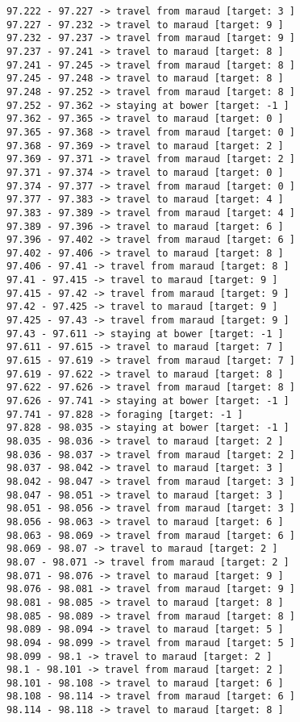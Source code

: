 \documentclass[11pt]{article}
\begin{document}
\begin{Verbatim}[commandchars=\\\{\}]
97.222 - 97.227 -> travel from maraud [target: 3 ]
97.227 - 97.232 -> travel to maraud [target: 9 ]
97.232 - 97.237 -> travel from maraud [target: 9 ]
97.237 - 97.241 -> travel to maraud [target: 8 ]
97.241 - 97.245 -> travel from maraud [target: 8 ]
97.245 - 97.248 -> travel to maraud [target: 8 ]
97.248 - 97.252 -> travel from maraud [target: 8 ]
97.252 - 97.362 -> staying at bower [target: -1 ]
97.362 - 97.365 -> travel to maraud [target: 0 ]
97.365 - 97.368 -> travel from maraud [target: 0 ]
97.368 - 97.369 -> travel to maraud [target: 2 ]
97.369 - 97.371 -> travel from maraud [target: 2 ]
97.371 - 97.374 -> travel to maraud [target: 0 ]
97.374 - 97.377 -> travel from maraud [target: 0 ]
97.377 - 97.383 -> travel to maraud [target: 4 ]
97.383 - 97.389 -> travel from maraud [target: 4 ]
97.389 - 97.396 -> travel to maraud [target: 6 ]
97.396 - 97.402 -> travel from maraud [target: 6 ]
97.402 - 97.406 -> travel to maraud [target: 8 ]
97.406 - 97.41 -> travel from maraud [target: 8 ]
97.41 - 97.415 -> travel to maraud [target: 9 ]
97.415 - 97.42 -> travel from maraud [target: 9 ]
97.42 - 97.425 -> travel to maraud [target: 9 ]
97.425 - 97.43 -> travel from maraud [target: 9 ]
97.43 - 97.611 -> staying at bower [target: -1 ]
97.611 - 97.615 -> travel to maraud [target: 7 ]
97.615 - 97.619 -> travel from maraud [target: 7 ]
97.619 - 97.622 -> travel to maraud [target: 8 ]
97.622 - 97.626 -> travel from maraud [target: 8 ]
97.626 - 97.741 -> staying at bower [target: -1 ]
97.741 - 97.828 -> foraging [target: -1 ]
97.828 - 98.035 -> staying at bower [target: -1 ]
98.035 - 98.036 -> travel to maraud [target: 2 ]
98.036 - 98.037 -> travel from maraud [target: 2 ]
98.037 - 98.042 -> travel to maraud [target: 3 ]
98.042 - 98.047 -> travel from maraud [target: 3 ]
98.047 - 98.051 -> travel to maraud [target: 3 ]
98.051 - 98.056 -> travel from maraud [target: 3 ]
98.056 - 98.063 -> travel to maraud [target: 6 ]
98.063 - 98.069 -> travel from maraud [target: 6 ]
98.069 - 98.07 -> travel to maraud [target: 2 ]
98.07 - 98.071 -> travel from maraud [target: 2 ]
98.071 - 98.076 -> travel to maraud [target: 9 ]
98.076 - 98.081 -> travel from maraud [target: 9 ]
98.081 - 98.085 -> travel to maraud [target: 8 ]
98.085 - 98.089 -> travel from maraud [target: 8 ]
98.089 - 98.094 -> travel to maraud [target: 5 ]
98.094 - 98.099 -> travel from maraud [target: 5 ]
98.099 - 98.1 -> travel to maraud [target: 2 ]
98.1 - 98.101 -> travel from maraud [target: 2 ]
98.101 - 98.108 -> travel to maraud [target: 6 ]
98.108 - 98.114 -> travel from maraud [target: 6 ]
98.114 - 98.118 -> travel to maraud [target: 8 ]

\end{Verbatim}
\end{document}

